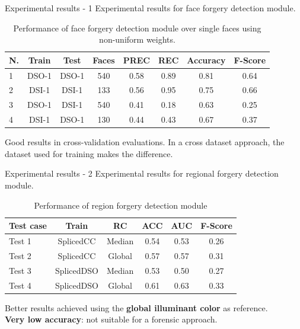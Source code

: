 \begin{tframe}{Experimental results - 1}
Experimental results for face forgery detection module.
\begin{footnotesize}
\begin{table}[h!]
\centering
\begin{tabular}{l c c c c c c c} 
\hline \hline 
\textbf{N.} & \textbf{Train} & \textbf{Test} & \textbf{Faces} & \textbf{PREC} & \textbf{REC} & \textbf{Accuracy} & \textbf{F-Score} \\ [0.5ex]
\hline
1 & DSO-1 & DSO-1 &	540 & 0.58 & 0.89 & 0.81	& 0.64\\
2 & DSI-1 & DSI-1 &	133 & 0.56 & 0.95 & 0.75 & 0.66\\
3 &	DSO-1 & DSI-1 & 540 & 0.41 & 0.18 & 0.63 & 0.25\\ 
4 &	DSI-1 &	DSO-1 &	130 & 0.44 & 0.43 & 0.67 & 0.37\\[1ex]

\hline
\end{tabular}
\caption{Performance of face forgery detection module over single faces using non-uniform weights.}
\label{table:forgerydetections}
\end{table}
\end{footnotesize}
\vspace{0.2cm}
Good results in cross-validation evaluations. In a cross dataset approach, the dataset used for training makes the difference.
\end{tframe}


\begin{tframe}{Experimental results - 2}
Experimental results for regional forgery detection module. 
\begin{footnotesize}
\begin{table}[h!]
\centering
\begin{tabular}{l c c c c c} 
\hline \hline 
\textbf{Test case} & \textbf{Train} & \textbf{RC} & \textbf{ACC} & \textbf{AUC} &\textbf{ F-Score} \\ [0.5ex]
\hline
Test 1 & SplicedCC & Median & 0.54 & 0.53 & 0.26\\
Test 2 & SplicedCC & Global & 0.57 & 0.57 & 0.31\\
Test 3 &	 SplicedDSO & Median & 0.53 & 0.50 & 0.27\\
Test 4 &	 SplicedDSO & Global & 0.61 & 0.63 & 0.33\\ [1ex]
\hline
\end{tabular}
\caption{Performance of region forgery detection module}
\label{table:performanceregionaldet}
\end{table}
\end{footnotesize}
Better results achieved using the\textbf{ global illuminant color }as reference.\\

\vspace{0.2cm}
\textbf{Very low accuracy}: not suitable for a forensic approach.
\end{tframe}

